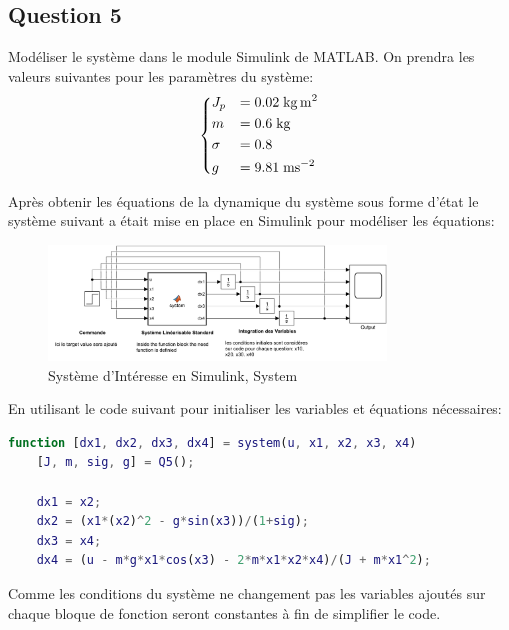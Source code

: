 \documentclass[class=article, crop=false]{standalone}
\begin{document}
\subsection{Question 5}
\begin{exercise}
    Modéliser le système dans le module Simulink de MATLAB. On prendra les valeurs suivantes pour les paramètres du système:
    \begin{equation}
        \begin{dcases}
            J_p &= 0.02 \; \unit{kg.m^{2}}\\
            m &= 0.6 \; \unit{kg}\\
            \sigma &= 0.8\\
            g &= 9.81 \; \unit{ms^{-2}}\\
        \end{dcases}
    \end{equation}
\end{exercise}
\begin{resolution}
    Après obtenir les équations de la dynamique du système sous forme d'état le système suivant a était mise en place en Simulink pour modéliser les équations:
    \begin{figure}[H]
        \centering
        \includegraphics[width = 0.8\textwidth]{../images/system_simulink_2.png}
        \caption{Système d'Intéresse en Simulink, System}
        \label{fig:simulink_system}
    \end{figure}
    En utilisant le code suivant pour initialiser les variables et équations nécessaires:
    \begin{scriptsize}\mycode
        
    \end{scriptsize}
    \begin{scriptsize}\mycode
    \begin{lstlisting}[language=Matlab]
function [dx1, dx2, dx3, dx4] = system(u, x1, x2, x3, x4)
    [J, m, sig, g] = Q5(); 
    
    dx1 = x2;
    dx2 = (x1*(x2)^2 - g*sin(x3))/(1+sig);
    dx3 = x4;
    dx4 = (u - m*g*x1*cos(x3) - 2*m*x1*x2*x4)/(J + m*x1^2);
        \end{lstlisting}
    \end{scriptsize}
  
    \begin{remark}
        Comme les conditions du système ne changement pas les variables ajoutés sur chaque bloque de fonction seront constantes à fin de simplifier le code.
    \end{remark}
\end{resolution}
\end{document}
